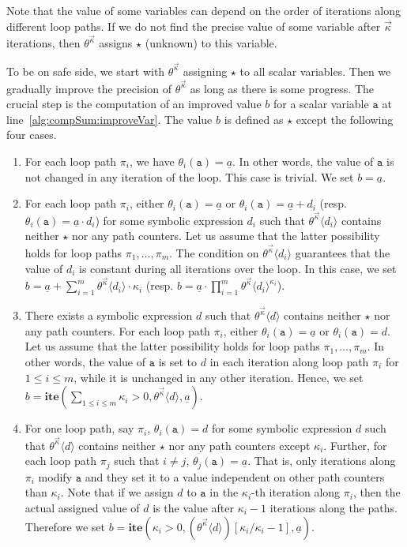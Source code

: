 \documentclass[10pt,a4paper]{article}
\newcommand{\var}[1]{\texttt{#1}}
\newcommand{\sym}[1]{\ensuremath{\underline{#1}}}
\newcommand{\ite}{\ensuremath{\mathbf{ite}}}
\begin{document}
Note that the value of some variables can depend on the order of iterations
along different loop paths. If we do not find the precise value of some
variable after $\vec{\kappa}$ iterations, then $\theta^{\vec{\kappa}}$
assigns $\star$ (unknown) to this variable.

To be on safe side, we start with $\theta^{\vec{\kappa}}$ assigning $\star$
to all scalar variables. Then we gradually improve the precision of
$\theta^{\vec{\kappa}}$ as long as there is some progress. The crucial step
is the computation of an improved value $b$ for a scalar variable $\var{a}$
at line~\ref{alg:compSum:improveVar}. The value $b$ is defined as $\star$
except the following four cases.
\begin{enumerate}
\item For each loop path $\pi_i$, we have $\theta_i(\var{a})=\sym{a}$. In
  other words, the value of $\var{a}$ is not changed in any iteration of the
  loop. This case is trivial. We set $b=\sym{a}$.
\item For each loop path $\pi_i$, either $\theta_i(\var{a})=\sym{a}$ or
  $\theta_i(\var{a})=\sym{a}+d_i$ (resp. $\theta_i(\var{a})=\sym{a}\cdot d_i$)
  for some symbolic expression $d_i$ such
  that $\theta^{\vec{\kappa}}\langle d_i\rangle$ contains neither $\star$
  nor any path counters. Let us assume that the latter possibility holds for
  loop paths $\pi_1,\ldots,\pi_{m}$. The condition on
  $\theta^{\vec{\kappa}}\langle d_i\rangle$ guarantees that the value of
  $d_i$ is constant during all iterations over the loop. In this case, we
  set $b=\sym{a}+\sum_{i=1}^{m}\theta^{\vec{\kappa}}\langle d_i\rangle\cdot\kappa_i$
  (resp. $b=\sym{a}\cdot\prod_{i=1}^{m}\theta^{\vec{\kappa}}\langle d_i\rangle^{\kappa_i}$).
\item There exists a symbolic expression $d$ such that
  $\theta^{\vec{\kappa}}\langle d\rangle$ contains neither $\star$ nor any
  path counters. For each loop path $\pi_i$, either
  $\theta_i(\var{a})=\sym{a}$ or $\theta_i(\var{a})=d$. Let us assume that
  the latter possibility holds for loop paths $\pi_1,\ldots,\pi_{m}$.  In
  other words, the value of $\var{a}$ is set to $d$ in each iteration along
  loop path $\pi_i$ for $1\le i\le m$, while it is unchanged in any other
  iteration. Hence, we set $b=\ite(\sum_{1\le i\le
    m}\kappa_i>0,\theta^{\vec{\kappa}}\langle d\rangle,\sym{a})$.
\item For one loop path, say $\pi_i$, $\theta_i(\var{a})=d$ for some
  symbolic expression $d$ such that $\theta^{\vec{\kappa}}\langle d\rangle$
  contains neither $\star$ nor any path counters except $\kappa_i$. Further,
  for each loop path $\pi_j$ such that $i\neq j$,
  $\theta_j(\var{a})=\sym{a}$. That is, only iterations along $\pi_i$ modify
  $\var{a}$ and they set it to a value independent on other path counters
  than $\kappa_i$. Note that if we assign $d$ to $\var{a}$ in the
  $\kappa_i$-th iteration along $\pi_i$, then the actual assigned value of
  $d$ is the value after $\kappa_i-1$ iterations along the paths. Therefore
  we set $b=\ite(\kappa_i>0,(\theta^{\vec{\kappa}}\langle
  d\rangle)[\kappa_i/\kappa_i-1],\sym{a})$.
\end{enumerate}
\end{document}
